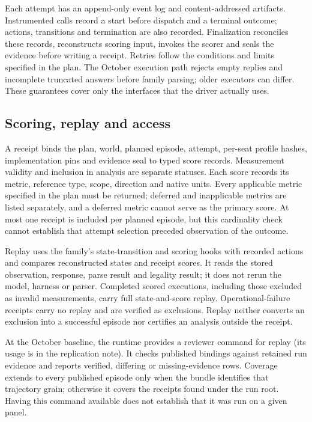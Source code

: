 Each attempt has an append-only event log and content-addressed artifacts.
Instrumented calls record a start before dispatch and a terminal outcome;
actions, transitions and termination are also recorded. Finalization
reconciles these records, reconstructs scoring input, invokes the scorer
and seals the evidence before writing a receipt. Retries follow the
conditions and limits specified in the plan. The October execution path rejects empty replies and
incomplete truncated answers before family parsing; older executors can
differ. These guarantees cover only the interfaces that the driver actually uses.

\subsection{Scoring, replay and access}
\label{app:runtime-replay}

A receipt binds the plan, world, planned episode, attempt, per-seat profile
hashes, implementation pins and evidence seal to typed score records.
Measurement validity and inclusion in analysis are separate statuses.
Each score records its metric, reference type, scope, direction and native
units. Every applicable metric specified in the plan must be returned; deferred and
inapplicable metrics are listed separately, and a deferred metric cannot serve
as the primary score. At most one receipt is included per planned episode,
but this cardinality check cannot establish that attempt selection
preceded observation of the outcome.

Replay uses the family's state-transition and scoring hooks with recorded
actions and compares reconstructed states and receipt scores. It reads
the stored observation, response, parse result and legality result; it
does not rerun the model, harness or parser. Completed scored executions,
including those excluded as invalid measurements, carry full state-and-score replay.
Operational-failure receipts carry no replay and are
verified as exclusions. Replay neither converts an exclusion into a
successful episode nor certifies an analysis outside the receipt.

At the October baseline, the runtime provides a reviewer command for replay (its usage is in the
replication note). It checks published bindings against retained run evidence and reports
verified, differing or missing-evidence rows. Coverage extends to every
published episode only when the bundle identifies that trajectory grain;
otherwise it covers the receipts found under the run root. Having this
command available does not establish that it was run on a given panel.

